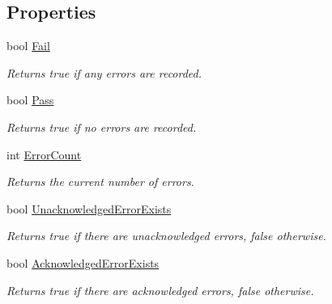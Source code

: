 \subsection*{Properties}
\begin{DoxyCompactItemize}
\item 
bool \mbox{\hyperlink{class_c_s_i_1_1_library_1_1_errors_1_1_error_list_a611379dd03da855446b03f61773ae8d5}{Fail}}
\begin{DoxyCompactList}\small\item\em Returns true if any errors are recorded. \end{DoxyCompactList}\item 
bool \mbox{\hyperlink{class_c_s_i_1_1_library_1_1_errors_1_1_error_list_a5826d180bd661f1b4c6285b9ca28712f}{Pass}}
\begin{DoxyCompactList}\small\item\em Returns true if no errors are recorded. \end{DoxyCompactList}\item 
int \mbox{\hyperlink{class_c_s_i_1_1_library_1_1_errors_1_1_error_list_a6157e0500ac697bc83e93ef7bf984712}{Error\+Count}}
\begin{DoxyCompactList}\small\item\em Returns the current number of errors. \end{DoxyCompactList}\item 
bool \mbox{\hyperlink{class_c_s_i_1_1_library_1_1_errors_1_1_error_list_ac89e2547e9f76d9ba7c8c3a10ab40dcd}{Unacknowledged\+Error\+Exists}}
\begin{DoxyCompactList}\small\item\em Returns true if there are unacknowledged errors, false otherwise. \end{DoxyCompactList}\item 
bool \mbox{\hyperlink{class_c_s_i_1_1_library_1_1_errors_1_1_error_list_a7e4181e9242e866cccf99596b98cd425}{Acknowledged\+Error\+Exists}}
\begin{DoxyCompactList}\small\item\em Returns true if there are acknowledged errors, false otherwise. \end{DoxyCompactList}\item 

\end{DoxyCompactItemize}
